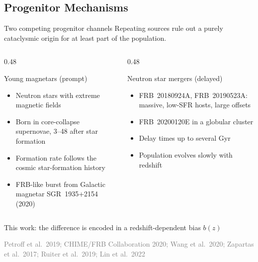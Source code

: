 \documentclass[aspectratio=1610, 10pt]{beamer}
\newcommand{\source}[1]{{\par\hfill\tiny\textcolor{gray}{#1}\par}}
\begin{document}
\subsection{Progenitor Mechanisms}
\begin{frame}{Two competing progenitor channels}
  Repeating sources rule out a purely cataclysmic origin for at least part of the population.
  \medskip
  \begin{columns}[t]
    \begin{column}{0.48\textwidth}
      \begin{block}{Young magnetars \hfill (prompt)}
        \small
        \begin{itemize}
          \item Neutron stars with extreme magnetic fields
          \item Born in core-collapse supernovae, \qtyrange{3}{48}{\Myr} after star formation
          \item Formation rate follows the cosmic star-formation history
          \item FRB-like burst from Galactic magnetar SGR~1935+2154 (2020)
        \end{itemize}
      \end{block}
    \end{column}
    \begin{column}{0.48\textwidth}
      \begin{block}{Neutron star mergers \hfill (delayed)}
        \small
        \begin{itemize}
          \item FRB~20180924A, FRB~20190523A: massive, low-SFR hosts, large offsets
          \item FRB~20200120E in a globular cluster
          \item Delay times up to several Gyr
          \item Population evolves slowly with redshift
        \end{itemize}
      \end{block}
    \end{column}
  \end{columns}
  \bigskip
  \centering
  This work: the difference is encoded in a \alert{redshift-dependent bias $b(z)$}
  \source{Petroff et al.\ 2019; CHIME/FRB Collaboration 2020; Wang et al.\ 2020; Zapartas et al.\ 2017; Ruiter et al.\ 2019; Lin et al.\ 2022}
\end{frame}
\end{document}
